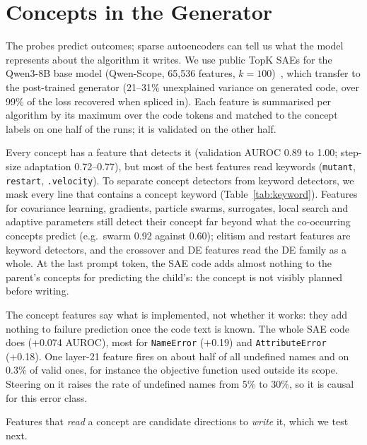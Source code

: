\section{Concepts in the Generator}\label{sec:concepts}

The probes predict outcomes; sparse autoencoders can tell us what the
model represents about the algorithm it writes. We use public TopK SAEs
for the Qwen3-8B base model (Qwen-Scope, 65,536 features,
$k=100$)~\cite{qwenscope}, which transfer to the post-trained generator
(21--31\% unexplained variance on generated code, over 99\% of the loss
recovered when spliced in). Each feature is summarised per algorithm by
its maximum over the code tokens and matched to the concept labels on
one half of the runs; it is validated on the other half.

Every concept has a feature that detects it (validation AUROC 0.89 to
1.00; step-size adaptation 0.72--0.77), but most of the best features
read keywords (\texttt{mutant}, \texttt{restart}, \texttt{.velocity}). To
separate concept detectors from keyword detectors, we mask every line
that contains a concept keyword (Table~\ref{tab:keyword}). Features for
covariance learning, gradients, particle swarms, surrogates, local
search and adaptive parameters still detect their concept far beyond
what the co-occurring concepts predict (e.g.\ swarm 0.92 against 0.60);
elitism and restart features are keyword detectors, and the crossover
and DE features read the DE family as a whole. At the last prompt token,
the SAE code adds almost nothing to the parent's concepts for predicting
the child's: the concept is not visibly planned before writing.

The concept features say what is implemented, not whether it works:
they add nothing to failure prediction once the code text is known. The
whole SAE code does (+0.074 AUROC), most for \texttt{NameError} (+0.19)
and \texttt{AttributeError} (+0.18). One layer-21 feature fires on about
half of all undefined names and on 0.3\% of valid ones, for instance the
objective function used outside its scope. Steering on it raises the
rate of undefined names from 5\% to 30\%, so it is causal for this
error class.

Features that \emph{read} a concept are candidate directions to
\emph{write} it, which we test next.
